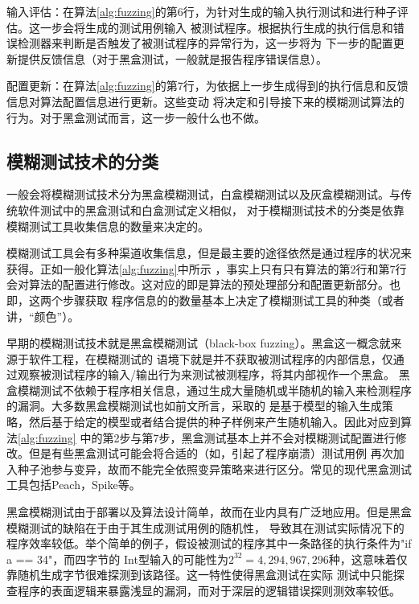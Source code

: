 \documentclass[bachelor]{njupthesis}
\begin{document}
输入评估：在算法\ref{alg:fuzzing}的第6行，为针对生成的输入执行测试和进行种子评估。这一步会将生成的测试用例输入
被测试程序。根据执行生成的执行信息和错误检测器来判断是否触发了被测试程序的异常行为，这一步将为
下一步的配置更新提供反馈信息（对于黑盒测试，一般就是报告程序错误信息）。

配置更新：在算法\ref{alg:fuzzing}的第7行，为依据上一步生成得到的执行信息和反馈信息对算法配置信息进行更新。这些变动
将决定和引导接下来的模糊测试算法的行为。对于黑盒测试而言，这一步一般什么也不做。

\subsection{模糊测试技术的分类}
一般会将模糊测试技术分为黑盒模糊测试，白盒模糊测试以及灰盒模糊测试。与传统软件测试中的黑盒测试和白盒测试\cite{myers2011art}定义相似，
对于模糊测试技术的分类是依靠模糊测试工具收集信息的数量来决定的\cite{manes2019art}。

模糊测试工具会有多种渠道收集信息，但是最主要的途径依然是通过程序的状况来获得。正如一般化算法\ref{alg:fuzzing}中所示
，事实上只有只有算法的第2行和第7行会对算法的配置进行修改。这对应的即是算法的预处理部分和配置更新部分。也即，这两个步骤获取
程序信息的的数量基本上决定了模糊测试工具的种类（或者讲，“颜色”）。

早期的模糊测试技术就是黑盒模糊测试\cite{beizer1995black}（black-box fuzzing）。黑盒这一概念就来源于软件工程，在模糊测试的
语境下就是并不获取被测试程序的内部信息，仅通过观察被测试程序的输入/输出行为来测试被测程序，将其内部视作一个黑盒。
黑盒模糊测试不依赖于程序相关信息，通过生成大量随机或半随机的输入来检测程序的漏洞。大多数黑盒模糊测试也如前文所言，采取的
是基于模型的输入生成策略，然后基于给定的模型或者结合提供的种子样例来产生随机输入。因此对应到算法\ref{alg:fuzzing}
中的第2步与第7步，黑盒测试基本上并不会对模糊测试配置进行修改。但是有些黑盒测试可能会将合适的（如，引起了程序崩溃）测试用例
再次加入种子池参与变异，故而不能完全依照变异策略来进行区分。常见的现代黑盒测试工具包括Peach\cite{Peach}，Spike\cite{Spike}等。

黑盒模糊测试由于部署以及算法设计简单，故而在业内具有广泛地应用。但是黑盒模糊测试的缺陷在于由于其生成测试用例的随机性，
导致其在测试实际情况下的程序效率较低。举个简单的例子，假设被测试的程序其中一条路径的执行条件为"if a == 34"，而四字节的
Int型输入的可能性为$2^{32}=4,294,967,296$种，这意味着仅靠随机生成字节很难探测到该路径。这一特性使得黑盒测试在实际
测试中只能探查程序的表面逻辑来暴露浅显的漏洞，而对于深层的逻辑错误探则测效率较低。
\end{document}
